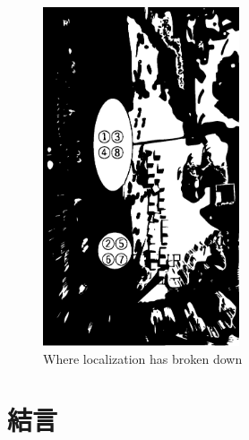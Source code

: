 \documentclass{jarticle}
\begin{document}
\begin{figure}[h]
  \centering
   \includegraphics[height=100mm]{fig/failure_location.eps}
   \vspace*{-4mm}
   \caption{Where localization has broken down}
   \label{fig: 失敗箇所}
\end{figure}


\section{結言}%


\footnotesize
\begin{thebibliography}{99}





\end{thebibliography}

\normalsize
\end{document}
